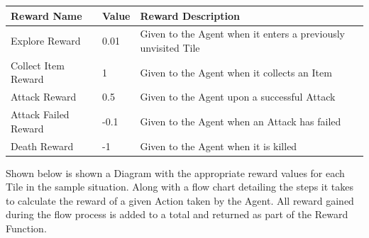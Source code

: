 \begin{flushleft}
            \vspace{0.2cm}
            \begin{center}
                \begin{tabular}{| L{2cm} | L{1cm} | L{8cm} |}
                    \hline
                    Reward Name & Value & Reward Description \\
                    \hline
                    Explore Reward & 0.01 & Given to the Agent when it enters a previously unvisited Tile  \\
                    \hline
                    Collect Item Reward & 1 & Given to the Agent when it collects an Item \\
                    \hline
                    Attack Reward & 0.5 & Given to the Agent upon a successful Attack \\
                    \hline
                    Attack Failed Reward & -0.1 & Given to the Agent when an Attack has failed \\
                    \hline
                    Death Reward & -1 & Given to the Agent when it is killed \\
                    \hline
                \end{tabular}
            \end{center}
            \vspace{0.2cm}

            Shown below is shown a Diagram with the appropriate reward values for each Tile in the sample situation. Along with a flow chart 
            detailing the steps it takes to calculate the reward of a given Action taken by the Agent. All reward gained during the flow process is
            added to a total and returned as part of the Reward Function.


\end{flushleft}
